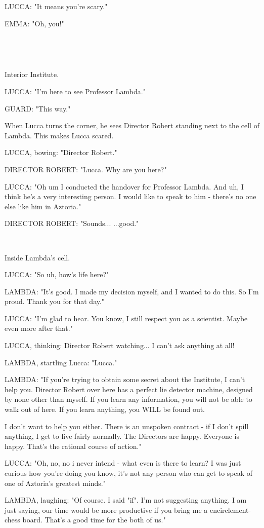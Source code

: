 \documentclass[11pt]{article}
\begin{document}
LUCCA: "It means you're scary."

EMMA: "Oh, you!"

\ 

\ 

Interior Institute.

LUCCA: "I'm here to see Professor Lambda."

GUARD: "This way."

When Lucca turns the corner, he sees Director Robert standing next to the cell of Lambda.
This makes Lucca scared.

LUCCA, bowing: "Director Robert."

DIRECTOR ROBERT: "Lucca. Why are you here?"

LUCCA: "Oh um I conducted the handover for Professor Lambda.
And uh, I think he's a very interesting person. 
I would like to speak to him - there's no one else like him in Aztoria."

DIRECTOR ROBERT: "Sounds...
...good."

\ 

Inside Lambda's cell.

LUCCA: "So uh, how's life here?"

LAMBDA: "It's good.
I made my decision myself, and I wanted to do this.
So I'm proud. 
Thank you for that day."

LUCCA: "I'm glad to hear. You know, I still respect you as a scientist. Maybe even more after that."

LUCCA, thinking: Director Robert watching... I can't ask anything at all!

LAMBDA, startling Lucca: "Lucca."

LAMBDA: "If you're trying to obtain some secret about the Institute, I can't help you. 
Director Robert over here has a perfect lie detector machine, designed by none other than myself.
If you learn any information, you will not be able to walk out of here.
If you learn anything, you WILL be found out.

I don't want to help you either. 
There is an unspoken contract - if I don't spill anything, I get to live fairly normally.
The Directors are happy.
Everyone is happy.
That's the rational course of action."

LUCCA: "Oh, no, no i never intend - what even is there to learn?
I was just curious how you're doing you know, it's not any person who can get to speak of one of Aztoria's greatest minds."

LAMBDA, laughing: "Of course. I said "if". 
I'm not suggesting anything.
I am just saying, our time would be more productive if you bring me a encirclement-chess board. 
That's a good time for the both of us."
\end{document}
